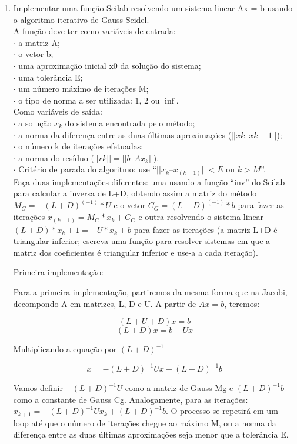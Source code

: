 \documentclass[leqno]{article}
\numberwithin{equation}{section}
\begin{document}
\begin{enumerate}
		\item Implementar uma função Scilab resolvendo um sistema linear Ax
		= b usando o algoritmo iterativo de Gauss-Seidel.\\
		A função deve ter como variáveis de entrada:\\
		$\cdot$ a matriz A;\\
		$\cdot$ o vetor b;\\
		$\cdot$ uma aproximação inicial x0 da solução do sistema;\\
		$\cdot$ uma tolerância E;\\
		$\cdot$ um número máximo de iterações M;\\
		$\cdot$ o tipo de norma a ser utilizada: $1$, $2$ ou $\inf$. \\
		Como variáveis de saída:\\
		$\cdot$ a solução $x_k$ do sistema encontrada pelo método;\\
		$\cdot$ a norma da diferença entre as duas últimas aproximações
		($||xk – xk-1||$);\\
		$\cdot$ o número k de iterações efetuadas;\\
		$\cdot$ a norma do resíduo ($||rk|| = ||b – Ax_k||$).\\
		$\cdot$ Critério de parada do algoritmo: use “$||x_k – x_(k-1)|| < E$ ou $k > M$”.\\
		
		Faça duas implementações diferentes: uma usando a função “inv”
		do Scilab para calcular a inversa de L+D, obtendo assim a matriz
		do método $M_G = -(L+D)^(-1) * U$ e o vetor $C_G = (L+D)^(-1) * b$ para fazer as
		iterações $x_(k+1) = M_G*x_k + C_G$ e outra resolvendo o sistema linear
		$(L+D) * x_k+1 = -U * x_k + b$ para fazer as iterações (a matriz L+D é
		triangular inferior; escreva uma função para resolver sistemas em
		que a matriz dos coeficientes é triangular inferior e use-a a cada
		iteração).
		
		\begin{sol}
			Primeira implementação:
	
	Para a primeira implementação, partiremos da mesma forma que na Jacobi, decompondo A em matrizes, L, D e U.
	A partir de $Ax = b$, teremos:
	
	$$(L + U + D)x = b$$
	$$(L + D)x = b - Ux$$
	
	Multiplicando a equação por $(L+D)^{-1}$
	
	$$x =  -(L+D)^{-1}Ux + (L+D)^{-1}b$$
	
	Vamos definir $-(L+D)^{-1}U$ como a matriz de Gauss Mg e $(L+D)^{-1}b$ como a constante de Gauss Cg.
	Analogamente, para as iterações: $x_{k+1} = -(L+D)^{-1}Ux_k + (L+D)^{-1}b$. O processo se repetirá em um loop até que o número de iterações chegue ao máximo M, ou a norma da diferença entre as duas últimas aproximações seja menor que a tolerância E.
	

\end{sol}
\end{enumerate}
\end{document}
